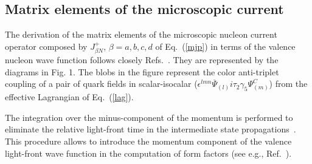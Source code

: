 \documentclass[preprint,aps,showpacs,floatfix]{revtex4}
\begin{document}
\begin{appendix}

\section{Matrix elements of the microscopic current}
\label{appendix}

The derivation of the matrix elements  of the microscopic nucleon
current operator composed by $J^+_{\beta N}$, $\beta=a,b,c,d$ of
Eq.~(\ref{mjp}) in terms of the valence nucleon wave function
follows closely Refs.~\cite{afsbw}. They are represented by the
diagrams in Fig. 1. The blobs in the figure
represent the color anti-triplet coupling of a pair of quark
fields in scalar-isocalar ($\epsilon^{lmn} \overline{\Psi}_{(l)}
i\tau _2\gamma _5\Psi_{(m)}^C$) from the effective Lagrangian of
Eq.~(\ref{lag}).

The integration over the minus-component of the momentum is   
performed to eliminate the relative light-front time in the
intermediate state propagations~\cite{sales00,tob92,Ji:1998hx}. 
This procedure allows to introduce the momentum component of the valence
light-front wave function in the computation of form factors 
(see e.g., Ref.~\cite{tob92}). 


\end{appendix}
\end{document}
